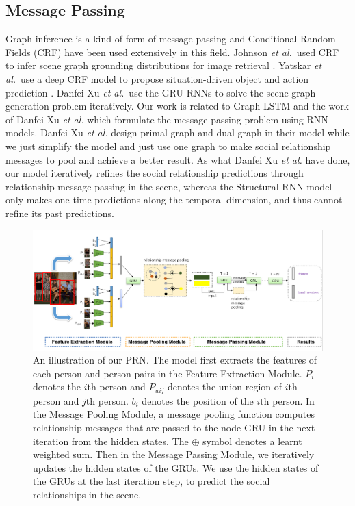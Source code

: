 \documentclass{article}
\newcommand{\PRN}{{\sf PRN}}
\newcommand{\etal}{{\it et al.}}
\begin{document}
\subsection{Message Passing}%
Graph inference is a kind of form of message passing and Conditional Random Fields (CRF) have been used extensively in this field. Johnson \etal \ used CRF to infer scene graph grounding distributions for image retrieval \cite{DBLP:conf/cvpr/JohnsonKSLSBL15}. Yatskar \etal \ use a deep CRF model to propose situation-driven object and action prediction\cite{DBLP:conf/cvpr/YatskarZF16} . Danfei Xu \etal \ use the GRU-RNNs to solve the scene graph generation problem iteratively\cite{DBLP:conf/cvpr/XuZCF17}. Our work is related to Graph-LSTM \cite{DBLP:conf/eccv/LiangSFLY16} and  the work of  Danfei Xu \etal \cite{DBLP:conf/cvpr/XuZCF17} which formulate the message passing problem using RNN models. Danfei Xu \etal \cite{DBLP:conf/cvpr/XuZCF17} design primal graph and dual graph in their model while we just simplify the model and just use one graph to make social relationship messages to pool and achieve a better result. As what Danfei Xu \etal \cite{DBLP:conf/cvpr/XuZCF17} have done, our model iteratively refines the social relationship predictions through relationship message passing in the scene, whereas the Structural RNN model only makes one-time predictions along the temporal dimension, and thus cannot refine its past predictions\cite{DBLP:conf/cvpr/XuZCF17}.
\vspace*{-3mm}
\begin{figure}[htpb]
	\centering
	\includegraphics[width=0.96 \textwidth,clip]{./pic/model_2.png}
	\caption{An illustration of our \PRN . The model first extracts the features of each person and person pairs in the Feature Extraction Module. $P_i$ denotes the $i$th person and $P_{uij}$ denotes the union region of $i$th person and $j$th person. $b_i$ denotes the position of the $i$th person. In the Message Pooling Module, a message pooling function computes relationship messages that are passed to the node GRU in the next iteration from the hidden states. The $\oplus$ symbol denotes a learnt weighted sum. Then in the Message Passing Module, we iteratively updates the hidden states of the GRUs. We use the hidden states of the GRUs at the last iteration step, to predict the social relationships in the scene.}
	\vspace*{-3.5mm}
	\label{fig:model}
\end{figure}
\end{document}

